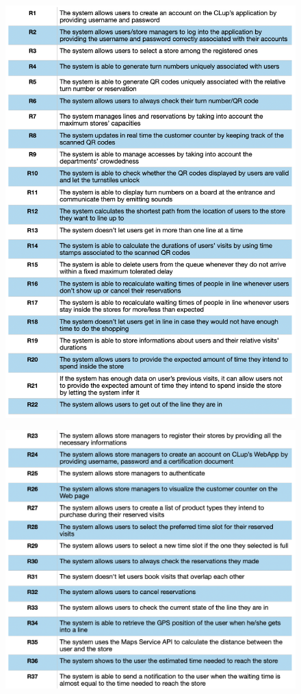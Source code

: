 \documentclass{article}
\begin{document}
\begin{figure}[H]
  \includegraphics[width=\linewidth]{Requirements1.png}
  
\end{figure}
\begin{figure}[H]
  \includegraphics[width=\linewidth]{Requirements2.png}
  
\end{figure}
\end{document}
